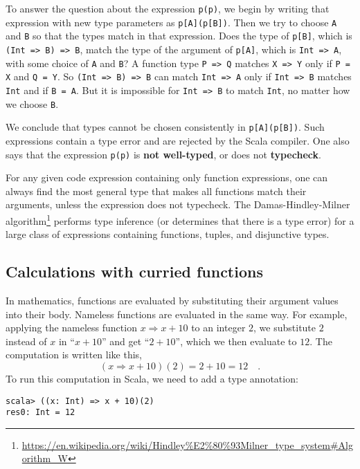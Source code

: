 To answer the question about the expression \lstinline!p(p)!, we
begin by writing that expression with new type parameters as \lstinline!p[A](p[B])!.
Then we try to choose \lstinline!A! and \lstinline!B! so that the
types match in that expression. Does the type of \lstinline!p[B]!,
which is \lstinline!(Int => B) => B!, match the type of the argument
of \lstinline!p[A]!, which is \lstinline!Int => A!, with some choice
of \lstinline!A! and \lstinline!B!? A function type \lstinline!P => Q!
matches \lstinline!X => Y! only if \lstinline!P = X! and \lstinline!Q = Y!.
So \lstinline!(Int => B) => B! can match \lstinline!Int => A! only
if \lstinline!Int => B! matches \lstinline!Int! and if \lstinline!B = A!.
But it is impossible for \lstinline!Int => B! to match \lstinline!Int!,
no matter how we choose \lstinline!B!. 

We conclude that types cannot be chosen consistently in \lstinline!p[A](p[B])!.
Such expressions contain a type error and are rejected by the Scala
compiler. One also says that the expression \lstinline!p(p)! is \textbf{not
well-typed}, or does not \textbf{typecheck}.

For any given code expression containing only function expressions,
one can always find the most general type that makes all functions
match their arguments, unless the expression does not typecheck. The
Damas-Hindley-Milner algorithm\footnote{\href{https://en.wikipedia.org/wiki/Hindley\%E2\%80\%93Milner_type_system\#Algorithm_W}{https://en.wikipedia.org/wiki/Hindley\%E2\%80\%93Milner\_type\_system\#Algorithm\_W}}
performs type inference (or determines that there is a type error)
for a large class of expressions containing functions, tuples, and
disjunctive types. 

\subsection{Calculations with curried functions}

In mathematics, functions are evaluated by substituting their argument
values into their body. Nameless functions are evaluated in the same
way. For example, applying the nameless function $x\Rightarrow x+10$
to an integer $2$, we substitute $2$ instead of $x$ in \textquotedblleft $x+10$\textquotedblright{}
and get \textquotedblleft $2+10$\textquotedblright , which we then
evaluate to $12$. The computation is written like this, 
\[
(x\Rightarrow x+10)(2)=2+10=12\quad.
\]
To run this computation in Scala, we need to add a type annotation:
\begin{lstlisting}
scala> ((x: Int) => x + 10)(2)
res0: Int = 12 
\end{lstlisting}

